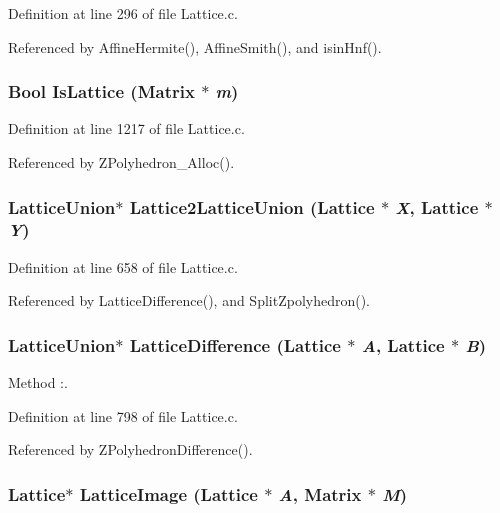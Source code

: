 Definition at line 296 of file Lattice.c.

Referenced by Affine\-Hermite(), Affine\-Smith(), and isin\-Hnf().

\subsubsection{\setlength{\rightskip}{0pt plus 5cm}Bool Is\-Lattice (Matrix $\ast$ {\em m})}\label{Lattice_8c_a26}




Definition at line 1217 of file Lattice.c.

Referenced by ZPolyhedron\_\-Alloc().

\subsubsection{\setlength{\rightskip}{0pt plus 5cm}Lattice\-Union$\ast$ Lattice2Lattice\-Union (Lattice $\ast$ {\em X}, Lattice $\ast$ {\em Y})}\label{Lattice_8c_a20}




Definition at line 658 of file Lattice.c.

Referenced by Lattice\-Difference(), and Split\-Zpolyhedron().

\subsubsection{\setlength{\rightskip}{0pt plus 5cm}Lattice\-Union$\ast$ Lattice\-Difference (Lattice $\ast$ {\em A}, Lattice $\ast$ {\em B})}\label{Lattice_8c_a21}


Method :.



Definition at line 798 of file Lattice.c.

Referenced by ZPolyhedron\-Difference().

\subsubsection{\setlength{\rightskip}{0pt plus 5cm}Lattice$\ast$ Lattice\-Image (Lattice $\ast$ {\em A}, Matrix $\ast$ {\em M})}\label{Lattice_8c_a24}




